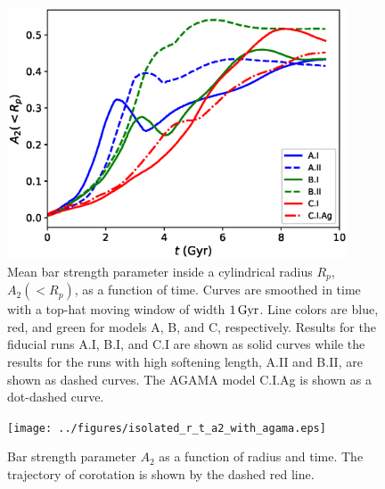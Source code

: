 \begin{figure}
	\centering
	\includegraphics[width=0.9\textwidth]{../figures/isolated_a2_vs_t_2rd_weighted.eps}
	\caption{Mean bar strength parameter inside a cylindrical
          radius $R_p$, $A_2(<R_p)$, as a function of time. Curves are
          smoothed in time with a top-hat moving window of width
          $1\,{\rm Gyr}$.  Line colors are blue, red, and green for
          models A, B, and C, respectively.  Results for the
          fiducial runs A.I, B.I, and C.I are shown as solid curves
          while the results for the runs with high softening length,
          A.II and B.II, are shown as dashed curves.  The
          \textsc{AGAMA} model C.I.Ag is shown as a dot-dashed
          curve.} \label{fig:isolated_a2_vs_t}
\end{figure}

\begin{figure}
	\centering
	\texttt{[image: ../figures/isolated\_r\_t\_a2\_with\_agama.eps]}
	\caption{Bar strength parameter $A_2$ as a function of radius
          and time.  The trajectory of corotation is shown by the
          dashed red line.} \label{fig:isolated_r_t_a2}
\end{figure}

